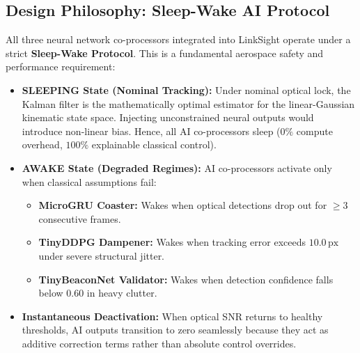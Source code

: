 \documentclass[11pt,a4paper]{article}
\begin{document}
\subsection{Design Philosophy: Sleep-Wake AI Protocol}
All three neural network co-processors integrated into LinkSight operate under a strict \textbf{Sleep-Wake Protocol}. This is a fundamental aerospace safety and performance requirement:
\begin{itemize}
    \item \textbf{SLEEPING State (Nominal Tracking):} Under nominal optical lock, the Kalman filter is the mathematically optimal estimator for the linear-Gaussian kinematic state space. Injecting unconstrained neural outputs would introduce non-linear bias. Hence, all AI co-processors sleep ($0\%$ compute overhead, $100\%$ explainable classical control).
    \item \textbf{AWAKE State (Degraded Regimes):} AI co-processors activate only when classical assumptions fail:
    \begin{itemize}[noitemsep]
        \item \textbf{MicroGRU Coaster:} Wakes when optical detections drop out for $\ge 3$ consecutive frames.
        \item \textbf{TinyDDPG Dampener:} Wakes when tracking error exceeds $10.0\,\text{px}$ under severe structural jitter.
        \item \textbf{TinyBeaconNet Validator:} Wakes when detection confidence falls below $0.60$ in heavy clutter.
    \end{itemize}
    \item \textbf{Instantaneous Deactivation:} When optical SNR returns to healthy thresholds, AI outputs transition to zero seamlessly because they act as additive correction terms rather than absolute control overrides.
\end{itemize}
\end{document}
